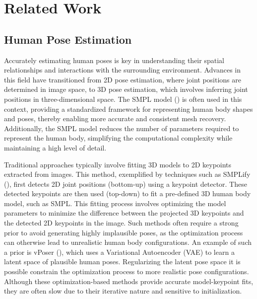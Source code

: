 

\chapter{Related Work}
\section{Human Pose Estimation}
Accurately estimating human poses is key in understanding their spatial relationships and interactions with the surrounding environment. Advances in this field have transitioned from 2D pose estimation, where joint positions are determined in image space, to 3D pose estimation, which involves inferring joint positions in three-dimensional space. The SMPL model (\cite{SMPL:2015}) is often used in this context, providing a standardized framework for representing human body shapes and poses, thereby enabling more accurate and consistent mesh recovery. Additionally, the SMPL model reduces the number of parameters required to represent the human body, simplifying the computational complexity while maintaining a high level of detail.

Traditional approaches typically involve fitting 3D models to 2D keypoints extracted from images. This method, exemplified by techniques such as SMPLify (\cite{BogoSMPLify2016}), first detects 2D joint positions (bottom-up) using a keypoint detector. These detected keypoints are then used (top-down) to fit a pre-defined 3D human body model, such as SMPL. This fitting process involves optimizing the model parameters to minimize the difference between the projected 3D keypoints and the detected 2D keypoints in the image. Such methods often require a strong prior to avoid generating highly implausible poses, as the optimization process can otherwise lead to unrealistic human body configurations. An example of such a prior is vPoser (\cite{SMPL-X:2019}), which uses a Variational Autoencoder (VAE) to learn a latent space of plausible human poses. Regularizing the latent pose space it is possible constrain the optimization process to more realistic pose configurations. Although these optimization-based methods provide accurate model-keypoint fits, they are often slow due to their iterative nature and sensitive to initialization. 

